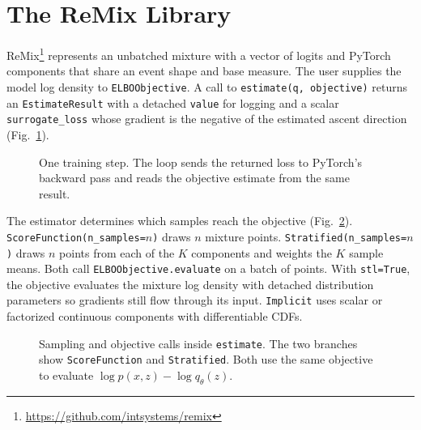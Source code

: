 \section{The ReMix Library}
\label{sec:library}
ReMix\footnote{\url{https://github.com/intsystems/remix}} represents an
unbatched mixture with a vector of logits and PyTorch components that share
an event shape and base measure. The user supplies the model log density to
\texttt{ELBOObjective}. A call to \texttt{estimate(q, objective)} returns
an \texttt{EstimateResult} with a detached \texttt{value} for logging and
a scalar \texttt{surrogate\_loss} whose gradient is the negative of the
estimated ascent direction (Fig.~\ref{fig:training-step}).

\begin{figure}[htbp]
 \centering
 
 \caption{One training step. The loop sends the returned loss to PyTorch's
 backward pass and reads the objective estimate from the same result.}
 \label{fig:training-step}
\end{figure}

The estimator determines which samples reach the objective
(Fig.~\ref{fig:estimator-calls}). \texttt{ScoreFunction(n\_samples=$n$)}
draws $n$ mixture points. \texttt{Stratified(n\_samples=$n$)} draws $n$
points from each of the $K$ components and weights the $K$ sample means.
Both call \texttt{ELBOObjective.evaluate} on a batch of points. With
\texttt{stl=True}, the objective evaluates the mixture log density with
detached distribution parameters so gradients still flow through its input.
\texttt{Implicit} uses scalar or factorized continuous components with
differentiable CDFs.

\begin{figure}[htbp]
 \centering
 
 \caption{Sampling and objective calls inside \texttt{estimate}.
 The two branches show \texttt{ScoreFunction} and \texttt{Stratified}. Both use the same
 objective to evaluate $\log p(x,z)-\log q_\theta(z)$.}
 \label{fig:estimator-calls}
\end{figure}

